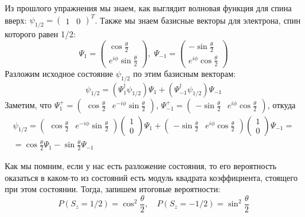 Из прошлого упражнения мы знаем, как выглядит волновая функция для спина вверх: $\psi_{1/2} =\begin{pmatrix} 1 & 0 \end{pmatrix}^T$. Также мы знаем базисные векторы для электрона, спин которого равен 1/2: 
\[
\Psi_1 = \begin{pmatrix}  \cos \frac{\theta}{2} \\ e^{i\phi} \sin\frac{\theta}{2}\end{pmatrix},\; \Psi_{-1} = \begin{pmatrix} -\sin\frac{\theta}{2} \\ e^{i\phi}\cos\frac{\theta}{2} \end{pmatrix}
\]
Разложим исходное состояние $\psi_{1/2}$ по этим базисным векторам:
\[
\psi_{1/2} = (\Psi_1^{\dagger}\psi_{1/2})\Psi_1 + (\Psi_{-1}^{\dagger}\psi_{1/2})\Psi_{-1}
\]
Заметим, что $\Psi_1^{+} = \begin{pmatrix} \cos\frac{\theta}{2} & e^{-i\phi}\sin\frac{\theta}{2} \end{pmatrix}$, $\Psi_{-1}^{+} = \begin{pmatrix} -\sin\frac{\theta}{2} & e^{i\phi}\cos\frac{\theta}{2} \end{pmatrix}$, откуда
\begin{gather*}
    \psi_{1/2} = \begin{pmatrix} \cos\frac{\theta}{2} & e^{-i\phi}\sin\frac{\theta}{2} \end{pmatrix} \begin{pmatrix} 1 \\ 0 \end{pmatrix} \Psi_1 + \begin{pmatrix} -\sin\frac{\theta}{2} & e^{i\phi}\cos\frac{\theta}{2} \end{pmatrix} \begin{pmatrix} 1 \\ 0 \end{pmatrix}\Psi_{-1} = \\ = \cos\frac{\theta}{2}\Psi_1 - \sin\frac{\theta}{2}\Psi_{-1}
\end{gather*}

Как мы помним, если у нас есть разложение состояния, то его вероятность оказаться в каком-то из состояний есть модуль квадрата коэффициента, стоящего при этом состоянии. Тогда, запишем итоговые вероятности:
\[
    P\left(S_z = 1/2\right) = \cos^2\frac{\theta}{2},\quad P\left(S_z = -1/2\right) = \sin^2\frac{\theta}{2}
\]
